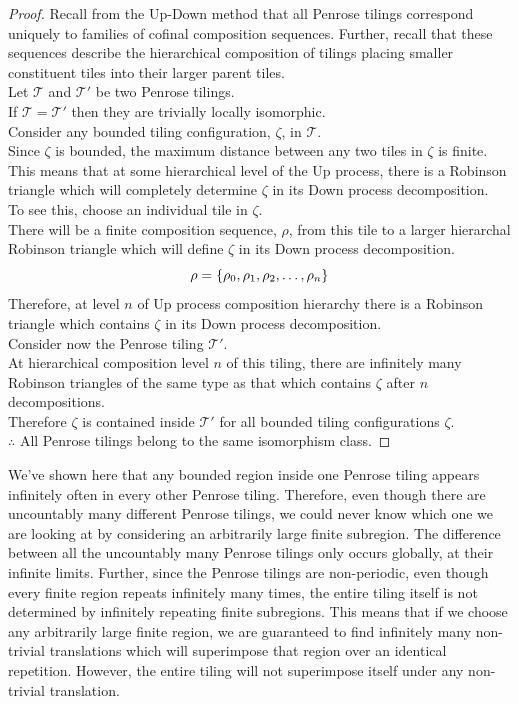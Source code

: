 \documentclass[
  oneside,
  11pt, a4paper,
  footinclude=true,
  headinclude=true,
  cleardoublepage=empty
]{scrbook}
\begin{document}
 \begin{proof}
 Recall from the Up-Down method that all Penrose tilings correspond uniquely to families of cofinal composition sequences. Further, recall that these sequences describe the hierarchical composition of tilings placing smaller constituent tiles into their larger parent tiles.\\
 Let $\mathcal{T}$ and $\mathcal{T}'$ be two Penrose tilings.\\
 If $\mathcal{T} = \mathcal{T}'$ then they are trivially locally isomorphic.\\
 Consider any bounded tiling configuration, $\zeta$, in $\mathcal{T}$.\\
 Since $\zeta$ is bounded, the maximum distance between any two tiles in $\zeta$ is finite.\\
 This means that at some hierarchical level of the Up process, there is a Robinson triangle which will completely determine $\zeta$ in its Down process decomposition.\\
 To see this, choose an individual tile in $\zeta$.\\
 There will be a finite composition sequence, $\rho$, from this tile to a larger hierarchal Robinson triangle which will define $\zeta$ in its Down process decomposition.\\
 \begin{equation*}
 \rho = \{\rho_0, \rho_1, \rho_2,\mathellipsis,\rho_n\}
 \end{equation*}
 Therefore, at level $n$ of Up process composition hierarchy there is a Robinson triangle which contains $\zeta$ in its Down process decomposition.\\
 Consider now the Penrose tiling $\mathcal{T}'$.\\
 At hierarchical composition level $n$ of this tiling, there are infinitely many Robinson triangles of the same type as that which contains $\zeta$ after $n$ decompositions.\\
 Therefore $\zeta$ is contained inside $\mathcal{T}'$ for all bounded tiling configurations $\zeta$.\\
 $\therefore$ All Penrose tilings belong to the same isomorphism class. 
 \end{proof}
 
 We've shown here that any bounded region inside one Penrose tiling appears infinitely often in every other Penrose tiling. Therefore, even though there are uncountably many different Penrose tilings, we could never know which one we are looking at by considering an arbitrarily large finite subregion. The difference between all the uncountably many Penrose tilings only occurs globally, at their infinite limits. Further, since the Penrose tilings are non-periodic, even though every finite region repeats infinitely many times, the entire tiling itself is not determined by infinitely repeating finite subregions. This means that if we choose any arbitrarily large finite region, we are guaranteed to find infinitely many non-trivial translations which will superimpose that region over an identical repetition. However, the entire tiling will not superimpose itself under any non-trivial translation.
 
\end{document}
